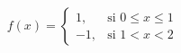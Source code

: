 \documentclass[preview]{standalone}
\begin{document}
\begin{align*}
f(x) = \left\{
            \begin{array}{ll}
            1, & \text{si } 0 \leq x \leq 1 \\
            -1, & \text{si } 1 < x < 2
            \end{array}
            \right.
\end{align*}
\end{document}

